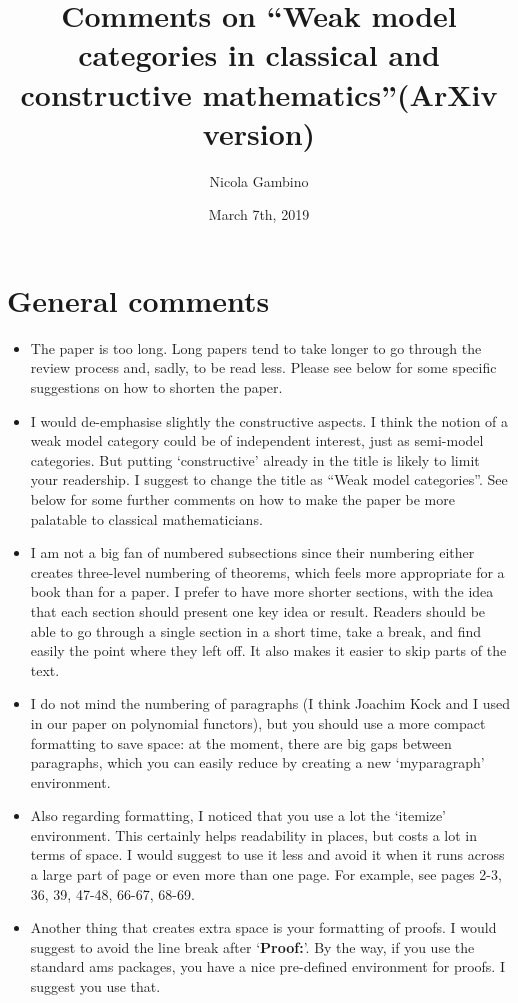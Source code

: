 \documentclass[11pt, oneside]{article}   	%
\title{Comments on ``Weak model categories in classical and constructive mathematics''(ArXiv version)}
\author{Nicola Gambino}
\date{March 7th, 2019}							%
\begin{document}
\maketitle

\section{General comments}

\begin{itemize}
\item The paper is too long. Long papers tend to take longer to go through the review process and, sadly, to be read less. Please see below for some specific suggestions on how to shorten the paper.
\item I would de-emphasise slightly the constructive aspects. I think the notion of a weak model category could be of independent interest, just as semi-model categories. But putting `constructive' already in the title is likely to limit your readership. I suggest to change the title as ``Weak model categories''. See below for some further comments on how to make the paper be more palatable to classical mathematicians.
\item I am not a big fan of numbered subsections since their numbering either creates three-level numbering of theorems, which feels more appropriate for a book than for a paper. I prefer to have more shorter sections, with the idea that each section should present one key idea or result. Readers should be able to go through a single section in a short time, take a break, and find easily the point where they left off. It also makes it easier to skip parts of the text.
\item I do not mind the numbering of paragraphs (I think Joachim Kock and I used in our paper on polynomial functors), but you should use a more compact formatting to save space: at the moment, there are big gaps between paragraphs, which you can easily reduce by creating a new `myparagraph' environment. 
\item Also regarding formatting, I noticed that you use a lot the `itemize' environment. This certainly helps readability in places, but costs a lot in terms of space. I would suggest to use it less and avoid it when it runs across a large part of page or even more than one page. For example, see pages 2-3, 36, 39, 47-48, 66-67, 68-69.
\item Another thing that creates extra space is your formatting of proofs. I would suggest to avoid the line break after  `{\bf Proof:}'. By the way, if you use the standard {\sc ams} packages, you have a nice pre-defined environment for proofs. I suggest you use that. 

\end{itemize}
\end{document}
